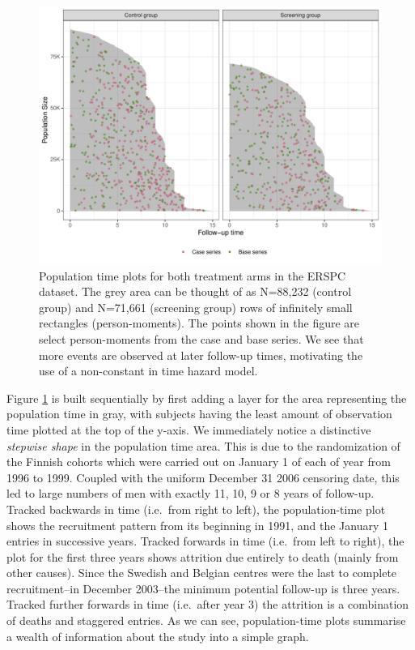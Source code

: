 \documentclass[
]{jss}
\begin{document}
\begin{CodeChunk}
\begin{figure}

{\centering \includegraphics[width=\textwidth,keepaspectratio=true]{../figures/plot-stratified-erspc-data-1} 

}

\caption[Population time plots for both treatment arms in the ERSPC dataset]{Population time plots for both treatment arms in the ERSPC dataset. The grey area can be thought of as N=88,232 (control group) and N=71,661 (screening group) rows of infinitely small rectangles (person-moments). The points shown in the figure are select person-moments from the case and base series. We see that more events are observed at later follow-up times, motivating the use of a non-constant in time hazard model.}\label{fig:plot-stratified-erspc-data}
\end{figure}
\end{CodeChunk}

Figure \ref{fig:plot-stratified-erspc-data} is built sequentially by
first adding a layer for the area representing the population time in
gray, with subjects having the least amount of observation time plotted
at the top of the y-axis. We immediately notice a distinctive
\emph{stepwise shape} in the population time area. This is due to the
randomization of the Finnish cohorts which were carried out on January 1
of each of year from 1996 to 1999. Coupled with the uniform December 31
2006 censoring date, this led to large numbers of men with exactly 11,
10, 9 or 8 years of follow-up. Tracked backwards in time (i.e.~from
right to left), the population-time plot shows the recruitment pattern
from its beginning in 1991, and the January 1 entries in successive
years. Tracked forwards in time (i.e.~from left to right), the plot for
the first three years shows attrition due entirely to death (mainly from
other causes). Since the Swedish and Belgian centres were the last to
complete recruitment--in December 2003--the minimum potential follow-up
is three years. Tracked further forwards in time (i.e.~after year 3) the
attrition is a combination of deaths and staggered entries. As we can
see, population-time plots summarise a wealth of information about the
study into a simple graph.
\end{document}
